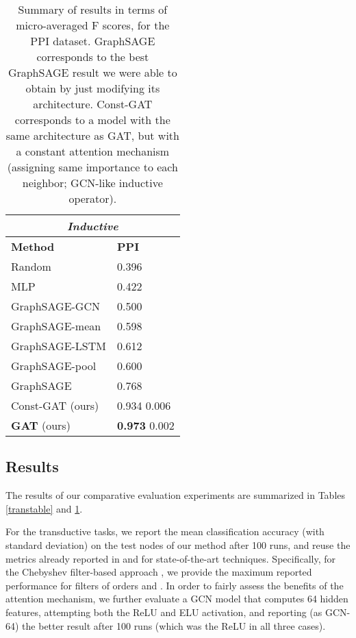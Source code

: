 \documentclass{article} \usepackage{iclr2018_conference,times}
\begin{document}
\begin{table}
\caption{Summary of results in terms of micro-averaged F scores, for the PPI dataset. GraphSAGE corresponds to the best GraphSAGE result we were able to obtain by just modifying its architecture. Const-GAT corresponds to a model with the same architecture as GAT, but with a constant attention mechanism (assigning same importance to each neighbor; GCN-like inductive operator).}
\label{indtable}
\begin{center}
\begin{tabular}{l l}
\multicolumn{2}{c}{\textbf{\emph{Inductive}}}\\
\toprule 
{\bf Method} & {\bf PPI}\\ \midrule
Random & 0.396\\
MLP & 0.422 \\
GraphSAGE-GCN \citep{hamilton2017inductive} & 0.500 \\
GraphSAGE-mean \citep{hamilton2017inductive} & 0.598 \\
GraphSAGE-LSTM \citep{hamilton2017inductive} & 0.612 \\
GraphSAGE-pool \citep{hamilton2017inductive} & 0.600 \\\midrule
GraphSAGE & 0.768\\
Const-GAT (ours) & 0.934  0.006\\
{\bf GAT} (ours) & {\bf 0.973}  0.002  \\\bottomrule \end{tabular}
\end{center}
\end{table}

\subsection{Results}
The results of our comparative evaluation experiments are summarized in Tables \ref{transtable} and \ref{indtable}. 

For the transductive tasks, we report the mean classification accuracy (with standard deviation) on the test nodes of our method after 100 runs, and reuse the metrics already reported in \cite{kipf2016semi} and \cite{monti2016geometric} for state-of-the-art techniques. Specifically, for the Chebyshev filter-based approach \citep{defferrard2016convolutional}, we provide the maximum reported performance for filters of orders  and . In order to fairly assess the benefits of the attention mechanism, we further evaluate a GCN model that computes 64 hidden features, attempting both the ReLU and ELU activation, and reporting (as GCN-64) the better result after 100 runs (which was the ReLU in all three cases).
\end{document}
